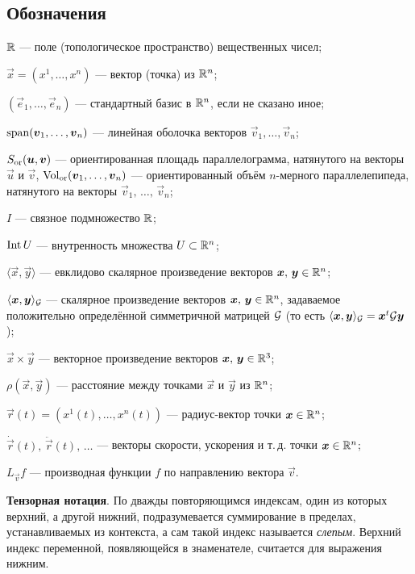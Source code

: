 \subsection*{Обозначения}

\begin{center}
	\begin{minipage}{.9\textwidth}
		$\mathbb{R}$ --- поле (топологическое пространство) вещественных чисел;

		$\vec{x} = (x^1, \ldots, x^n)$ --- вектор (точка) из $\mathbb{R}^n$;
		
		$(\vec{e}_1, \ldots, \vec{e}_n)$ --- стандартный базис в $\mathbb{R}^n$, если не сказано иное;

		$\operatorname{span}(\boldsymbol{v}_1, \ldots, \boldsymbol{v}_n)$ --- линейная оболочка векторов $\vec{v}_1, \ldots, \vec{v}_n$;

		$S_{\mathrm{or}}(\boldsymbol{u}, \boldsymbol{v})$ --- ориентированная площадь параллелограмма, натянутого на векторы $\vec{u}$ и $\vec{v}$, $\operatorname{Vol}_{\mathrm{or}}(\boldsymbol{v}_1, \ldots, \boldsymbol{v}_n)$ --- ориентированный объём $n$-мерного параллелепипеда, натянутого на векторы $\vec{v}_1,\,\ldots,\,\vec{v}_n$;

		$I$ --- связное подмножество $\mathbb{R}$;

		$\operatorname{Int} U$ --- внутренность множества $U \subset \mathbb{R}^n$;

		$\langle\vec{x}, \vec{y}\rangle$ --- евклидово скалярное произведение векторов $\boldsymbol{x},\,\boldsymbol{y} \in \mathbb{R}^n$;

		$\langle\boldsymbol{x}, \boldsymbol{y}\rangle_{\mathcal{G}}$ --- скалярное произведение векторов $\boldsymbol{x},\,\boldsymbol{y} \in \mathbb{R}^n$, задаваемое положительно определённой симметричной матрицей $\mathcal{G}$ (то есть $\langle\boldsymbol{x}, \boldsymbol{y}\rangle_{\mathcal{G}} = \boldsymbol{x}^t\mathcal{G}\boldsymbol{y}$);

		$\vec{x} \times \vec{y}$ --- векторное произведение векторов $\boldsymbol{x},\,\boldsymbol{y} \in \mathbb{R}^3$;

		$\rho(\vec{x}, \vec{y})$ --- расстояние между точками $\vec{x}$ и $\vec{y}$ из $\mathbb{R}^n$;

		$\vec{r}(t) = (x^1(t), \ldots, x^n(t))$ --- радиус-вектор точки $\boldsymbol{x} \in \mathbb{R}^n$;

		$\dot{\vec{r}}(t),\,\ddot{\vec{r}}(t),\,\ldots$ --- векторы скорости, ускорения и т.\,д. точки $\boldsymbol{x} \in \mathbb{R}^n$;

		$L_{\vec{v}}f$ --- производная функции $f$ по направлению вектора $\vec{v}$.

		\medskip
		\textbf{Тензорная нотация}. {\small По дважды повторяющимся индексам, один из которых верхний, а другой нижний, подразумевается суммирование в пределах, устанавливаемых из контекста, а сам такой индекс называется \textit{слепым}. Верхний индекс переменной, появляющейся в знаменателе, считается для выражения нижним.}
	\end{minipage}
\end{center}

